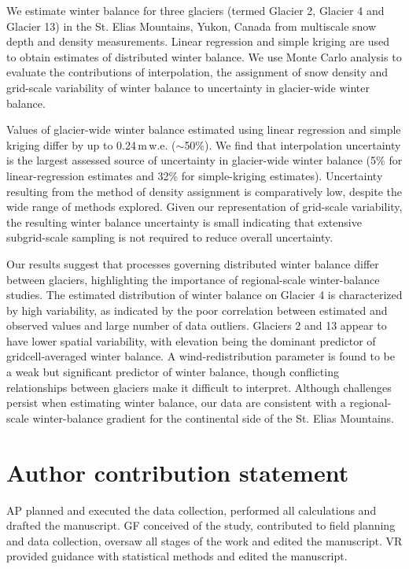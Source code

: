 \documentclass[review,oneside, letterpaper]{igs} %
\begin{document}
We estimate winter balance for three glaciers (termed Glacier 2, Glacier 4 and Glacier 13) in the St. Elias Mountains, Yukon, Canada from multiscale snow depth and density measurements. Linear regression and simple kriging are used to obtain estimates of distributed winter balance. We use Monte Carlo analysis to evaluate the contributions of interpolation, the assignment of snow density and grid-scale variability of winter balance to  uncertainty in glacier-wide winter balance. 

Values of glacier-wide winter balance estimated using linear regression and simple kriging differ by up to 0.24\,m\,w.e. ($\sim$50\%). We find that interpolation uncertainty is the largest assessed source of uncertainty in glacier-wide winter balance (5\% for linear-regression estimates and 32\% for simple-kriging estimates). Uncertainty resulting from the method of density assignment is comparatively low, despite the wide range of methods explored. Given our representation of grid-scale variability, the resulting winter balance uncertainty is small indicating that extensive subgrid-scale sampling is not required to reduce overall uncertainty. 

Our results suggest that processes governing distributed winter balance differ between glaciers, highlighting the importance of regional-scale winter-balance studies. The estimated distribution of winter balance on Glacier 4 is characterized by high variability, as indicated by the poor correlation between estimated and observed values and large number of data outliers. Glaciers 2 and 13 appear to have lower spatial variability, with elevation being the dominant predictor of gridcell-averaged winter balance. A wind-redistribution parameter is found to be a weak but significant predictor of winter balance, though conflicting relationships between glaciers make it difficult to interpret.
Although challenges persist when estimating winter balance, our data are consistent with a regional-scale winter-balance gradient for the continental side of the St. Elias Mountains. 

\section{Author contribution statement}

AP planned and executed the data collection, performed all calculations and drafted the manuscript. GF conceived of the study, contributed to field planning and data collection, oversaw all stages of the work and edited the manuscript. VR provided guidance with statistical methods and edited the manuscript.
\end{document}
